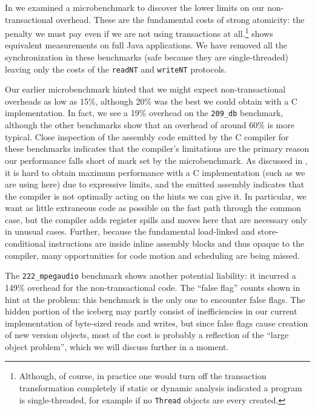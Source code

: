 In  we examined a microbenchmark to discover the
lower limits on our non-transactional overhead.  These are the
fundamental costs of strong atomicity: the penalty we must pay even if
we are not using transactions at all.\footnote{Although, of course, in
  practice one would turn off the transaction transformation
  completely if static or dynamic analysis indicated a program is
  single-threaded, for example if no \texttt{Thread} objects are every
  created.}   shows equivalent measurements on
full Java applications.  We have removed all the synchronization in
these benchmarks (safe because they are single-threaded) leaving only
the costs of the \texttt{readNT} and \texttt{writeNT} protocols.

Our earlier microbenchmark hinted that we might expect
non-transactional overheads as low as 15\%, although 20\% was the best
we could obtain with a C implementation.  In fact, we see a 19\%
overhead on the \texttt{209\_db} benchmark, although the other
benchmarks show that an overhead of around 60\% is more typical.
Close inspection of the assembly code emitted by the C compiler for
these benchmarks indicates that the compiler's limitations are
the primary reason our performance falls short of mark set by the
microbenchmark.   As discussed in , it is hard to
obtain maximum performance with a C implementation (such as we are
using here) due to expressive limits, and the emitted assembly
indicates that the compiler is not optimally acting on the hints we
can give it.  In particular, we want as little extraneous code as
possible on the fast path through the common case, but the compiler
adds register spills and moves here that are necessary only in
unusual cases.  Further, because the fundamental load-linked and
store-conditional instructions are inside inline assembly blocks and
thus opaque to the compiler, many opportunities for code motion and
scheduling are being missed.

The \texttt{222\_mpegaudio} benchmark shows another potential
liability: it incurred a 149\% overhead for the non-transactional
code.  The ``false flag'' counts shown in  hint at
the problem: this benchmark is the only one to encounter false
flags.  The hidden portion of the iceberg may partly consist of
inefficiencies in our current implementation of byte-sized reads and
writes, but since false flags cause creation of new version objects,
most of the cost is probably a reflection of the ``large object
problem'', which we will discuss further in a moment.

